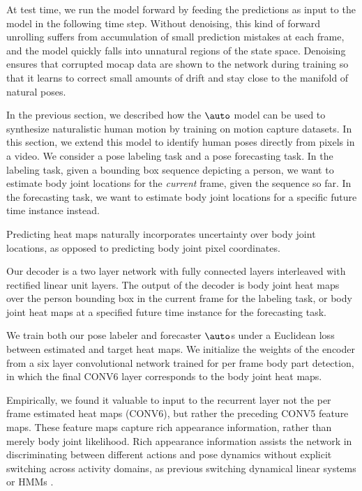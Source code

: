 \documentclass[10pt,twocolumn,letterpaper]{article}
\begin{document}
At test time, we  run the model forward by feeding the predictions as input to the model in the following time step. Without  denoising, this kind of forward unrolling  suffers from accumulation of small prediction mistakes at each frame, and the model  
quickly falls into unnatural regions of the state space. 
Denoising ensures that corrupted mocap data are shown to the network during training so that it learns to  correct small amounts of drift and stay close to the manifold of natural poses.

In the previous section, we described how the $\auto$ model can be used to synthesize naturalistic human motion by training on  motion capture datasets. 
In this section, we extend this model to identify human poses directly from pixels in a video. We consider a pose labeling task and a pose forecasting task. In the labeling task, given a bounding box sequence depicting a person, we want to estimate body joint locations for the \textit{current} frame, given the sequence so far.
In the forecasting task, we want to estimate body joint locations for a specific future time instance instead.   

Predicting heat maps naturally incorporates uncertainty over  body joint locations, as opposed to predicting body joint pixel coordinates. 
 
Our decoder is a two layer network with fully connected layers interleaved with  rectified linear unit layers.  
 The output of the decoder  is    body joint heat maps over the person bounding box in the current frame for the labeling task, or body joint heat maps at a specified future time instance for the forecasting  task. 

We train both our pose labeler and forecaster $\auto$s under a Euclidean loss between estimated and target heat maps. 
We initialize the weights of the encoder from a   six layer convolutional network trained for per frame body part detection, in which the final CONV6 layer corresponds to the body joint heat maps.  %

Empirically, we found it valuable to input to the recurrent layer not the per frame estimated heat maps (CONV6), but rather the preceding CONV5  feature maps.   These feature maps capture rich appearance information, rather than merely  body joint likelihood.  
Rich appearance information  assists the network in discriminating between different actions and pose dynamics without  explicit switching across activity domains, as previous switching dynamical linear systems  or HMMs \cite{prm-lslmh-00}.
\end{document}

